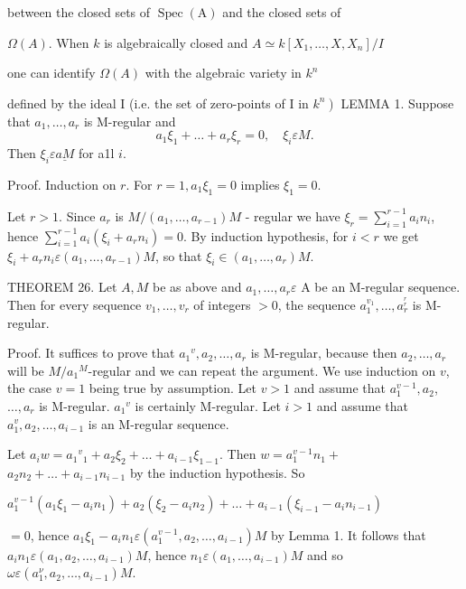between the closed sets of $\operatorname{Spec}(\mathrm{A})$ and the closed sets of

$\Omega(A)$. When $k$ is algebraically closed and $A \simeq k\left[X_{1}, \ldots, X, X_{n}\right] / I$

one can identify $\Omega(A)$ with the algebraic variety in $k^{n}$

defined by the ideal I (i.e. the set of zero-points of I in $\left.k^{n}\right)$ LEMMA 1. Suppose that $a_{1}, \ldots, a_{r}$ is M-regular and
$$
a_{1} \xi_{1}+\ldots+a_{r} \xi_{r}=0, \quad \xi_{i} \varepsilon M .
$$
Then $\xi_{i} \varepsilon \underline{a M}$ for a1l $i$.

Proof. Induction on $r$. For $r=1, a_{1} \xi_{1}=0$ implies $\xi_{1}=0$.

Let $r>1 .$ Since $a_{r}$ is $M /\left(a_{1}, \ldots, a_{r-1}\right) M$ - regular we have $\xi_{r}=\sum_{i=1}^{r-1} a_{i} n_{i}$, hence $\sum_{i=1}^{r-1} a_{i}\left(\xi_{i}+a_{r} n_{i}\right)=0$. By induction hypothesis, for $i<r$ we get $\xi_{i}+a_{r} n_{i} \varepsilon\left(a_{1}, \ldots, a_{r-1}\right) M$, so that $\xi_{i} \in\left(a_{1}, \ldots, a_{r}\right) M$.

THEOREM 26. Let $A, M$ be as above and $a_{1}, \ldots, a_{r} \varepsilon$ A be an M-regular sequence. Then for every sequence $v_{1}, \ldots, v_{r}$ of integers $>0$, the sequence $a_{1}^{v_{1}}, \ldots, a_{r}^{{ }_{r}^{r}}$ is M-regular.

Proof. It suffices to prove that $a_{1}{ }^{v}, a_{2}, \ldots, a_{r}$ is M-regular, because then $a_{2}, \ldots, a_{r}$ will be $M / a_{1}{ }^{M}$-regular and we can repeat the argument. We use induction on $v$, the case $v=1$ being true by assumption. Let $v>1$ and assume that $a_{1}^{v-1}, a_{2}$, $\ldots, a_{r}$ is M-regular. $a_{1}{ }^{v}$ is certainly M-regular. Let $i>1$ and assume that $a_{1}^{v}, a_{2}, \ldots, a_{i-1}$ is an M-regular sequence.

Let $a_{i} w=a_{1}{ }^{v}{ }_{1}+a_{2} \xi_{2}+\ldots+a_{i-1} \xi_{1-1}$. Then $w=a_{1}^{v-1} n_{1}+$ $a_{2} n_{2}+\ldots+a_{i-1} n_{i-1}$ by the induction hypothesis. So

$a_{1}^{v-1}\left(a_{1} \xi_{1}-a_{i} n_{1}\right)+a_{2}\left(\xi_{2}-a_{i} n_{2}\right)+\ldots+a_{i-1}\left(\xi_{i-1}-a_{i} n_{i-1}\right)$

$=0$, hence $a_{1} \xi_{1}-a_{i} n_{1} \varepsilon\left(a_{1}^{v-1}, a_{2}, \ldots, a_{i-1}\right) M$ by Lemma 1. It follows that $a_{i} n_{1} \varepsilon\left(a_{1}, a_{2}, \ldots, a_{i-1}\right) M$, hence $n_{1} \varepsilon\left(a_{1}, \ldots, a_{i-1}\right) M$ and so $\omega \varepsilon\left(a_{1}^{\nu}, a_{2}, \ldots, a_{i-1}\right) M$.

